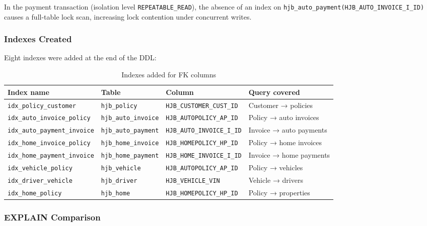 \documentclass[12pt,letterpaper]{article}
\begin{document}
In the payment transaction (isolation level \texttt{REPEATABLE\_READ}), the absence of an index on \texttt{hjb\_auto\_payment(HJB\_AUTO\_INVOICE\_I\_ID)} causes a full-table lock scan, increasing lock contention under concurrent writes.

\subsubsection*{Indexes Created}

Eight indexes were added at the end of the DDL:

\begin{table}[H]
\centering\small
\begin{tabular}{llll}
\toprule
\textbf{Index name} & \textbf{Table} & \textbf{Column} & \textbf{Query covered} \\
\midrule
\texttt{idx\_policy\_customer}      & \texttt{hjb\_policy}        & \texttt{HJB\_CUSTOMER\_CUST\_ID}  & Customer → policies \\
\texttt{idx\_auto\_invoice\_policy} & \texttt{hjb\_auto\_invoice} & \texttt{HJB\_AUTOPOLICY\_AP\_ID}  & Policy → auto invoices \\
\texttt{idx\_auto\_payment\_invoice}& \texttt{hjb\_auto\_payment} & \texttt{HJB\_AUTO\_INVOICE\_I\_ID}& Invoice → auto payments \\
\texttt{idx\_home\_invoice\_policy} & \texttt{hjb\_home\_invoice} & \texttt{HJB\_HOMEPOLICY\_HP\_ID}  & Policy → home invoices \\
\texttt{idx\_home\_payment\_invoice}& \texttt{hjb\_home\_payment} & \texttt{HJB\_HOME\_INVOICE\_I\_ID}& Invoice → home payments \\
\texttt{idx\_vehicle\_policy}       & \texttt{hjb\_vehicle}       & \texttt{HJB\_AUTOPOLICY\_AP\_ID}  & Policy → vehicles \\
\texttt{idx\_driver\_vehicle}       & \texttt{hjb\_driver}        & \texttt{HJB\_VEHICLE\_VIN}        & Vehicle → drivers \\
\texttt{idx\_home\_policy}          & \texttt{hjb\_home}          & \texttt{HJB\_HOMEPOLICY\_HP\_ID}  & Policy → properties \\
\bottomrule
\end{tabular}
\caption{Indexes added for FK columns}
\end{table}

\subsubsection*{EXPLAIN Comparison}
\end{document}
